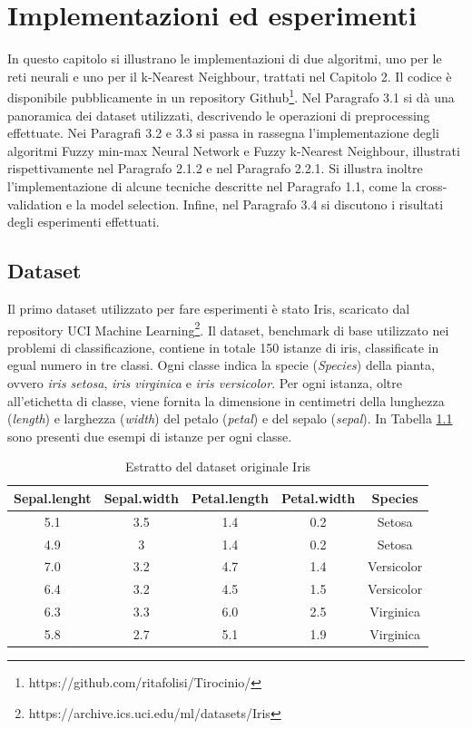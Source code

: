 \documentclass[11pt,  oneside, openany]{book}
\begin{document}
\clearpage



	\chapter{Implementazioni ed esperimenti}

In questo capitolo si illustrano le implementazioni di due algoritmi, uno per le reti neurali e uno per il k-Nearest Neighbour, trattati nel Capitolo 2. Il codice è disponibile pubblicamente in un repository Github\footnote{https://github.com/ritafolisi/Tirocinio/}. Nel Paragrafo 3.1 si dà una panoramica dei dataset utilizzati, descrivendo le operazioni di preprocessing effettuate. Nei Paragrafi 3.2 e 3.3 si passa in rassegna l'implementazione degli algoritmi Fuzzy min-max Neural Network e Fuzzy k-Nearest Neighbour, illustrati rispettivamente nel Paragrafo 2.1.2 e nel Paragrafo 2.2.1. Si illustra inoltre l'implementazione di alcune tecniche descritte nel Paragrafo 1.1, come la cross-validation e la model selection. Infine, nel Paragrafo 3.4 si discutono i risultati degli esperimenti effettuati. 


	\section{Dataset}
Il primo dataset utilizzato per fare esperimenti è stato Iris, scaricato dal repository UCI Machine Learning\footnote{https://archive.ics.uci.edu/ml/datasets/Iris}. Il dataset, benchmark di base utilizzato nei problemi di classificazione, contiene in totale 150 istanze di iris, classificate in egual numero in tre classi. Ogni classe indica la specie (\textit{Species}) della pianta, ovvero \textit{iris setosa}, \textit{iris virginica} e \textit{iris versicolor}. Per ogni istanza, oltre all'etichetta di classe, viene fornita la dimensione in centimetri della lunghezza (\textit{length}) e larghezza (\textit{width}) del petalo (\textit{petal}) e del sepalo (\textit{sepal}). In Tabella \ref{table:3} sono presenti due esempi di istanze per ogni classe. 

\begin{table} [h!]
    \centering 
    \begin{tabular}{|c|c|c|c|c|}
    \hline
        \textbf{Sepal.lenght} & \textbf{Sepal.width} & \textbf{Petal.length} & \textbf{Petal.width} & \textbf{Species} \\ \hline
        	5.1 	& 3.5 		& 1.4 		& 0.2 		&Setosa\\ 
	4.9 	& 3 		& 1.4 		& 0.2 		&Setosa \\ 
	7.0	& 3.2		& 4.7		&1.4		&Versicolor\\ 
	6.4	& 3.2		& 4.5		&1.5		&Versicolor\\
	6.3	&3.3		&6.0		&2.5		&Virginica\\ 
	5.8	&2.7		&5.1		&1.9		&Virginica\\ \hline	
   \end{tabular}
\caption{Estratto del dataset originale Iris}
\label{table:3}
\end{table}
\end{document}
